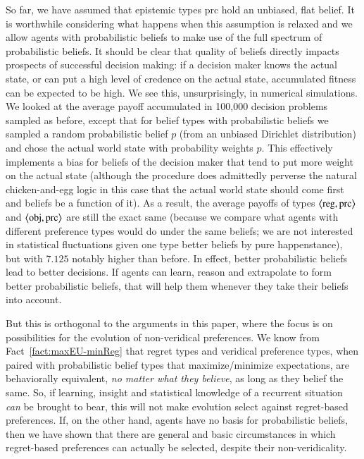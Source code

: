 \documentclass[fleqn,reqno,11pt]{article}
\begin{document}
So far, we have assumed that epistemic types $\text{prc}$ hold an unbiased, flat belief. It is
worthwhile considering what happens when this assumption is relaxed and we allow agents with
probabilistic beliefs to make use of the full spectrum of probabilistic beliefs. It should be
clear that quality of beliefs directly impacts prospects of successful decision making: if a
decision maker knows the actual state, or can put a high level of credence on the actual state,
accumulated fitness can be expected to be high. We see this, unsurprisingly, in numerical
simulations. We looked at the average payoff accumulated in 100,000 decision problems sampled
as before, except that for belief types with probabilistic beliefs we sampled a random
probabilistic belief $p$ (from an unbiased Dirichlet distribution) and chose the actual world
state with probability weights $p$. This effectively implements a bias for beliefs of the
decision maker that tend to put more weight on the actual state (although the procedure does
admittedly perverse the natural chicken-and-egg logic in this case that the actual world state
should come first and beliefs be a function of it). As a result, the average payoffs of types
$\left \langle \text{reg}, \text{prc}\right\rangle$ and $\left \langle \text{obj}, \text{prc}\right\rangle$ are still the exact same
(because we compare what agents with different preference types would do under the same
beliefs; we are not interested in statistical fluctuations given one type better beliefs by
pure happenstance), but with $7.125$ notably higher than before. In effect, better
probabilistic beliefs lead to better decisions. If agents can learn, reason and extrapolate to
form better probabilistic beliefs, that will help them whenever they take their beliefs into
account. 

But this is orthogonal to the arguments in this paper, where the focus is on possibilities for
the evolution of non-veridical preferences. We know from Fact~\ref{fact:maxEU-minReg} that
regret types and veridical preference types, when paired with probabilistic belief types that
maximize/minimize expectations, are behaviorally equivalent, \emph{no matter what they believe},
as long as they belief the same. So, if learning, insight and statistical knowledge of a
recurrent situation \emph{can} be brought to bear, this will not make evolution select against
regret-based preferences. If, on the other hand, agents have no basis for probabilistic
beliefs, then we have shown that there are general and basic circumstances in which
regret-based preferences can actually be selected, despite their non-veridicality.
\fi
\end{document}
